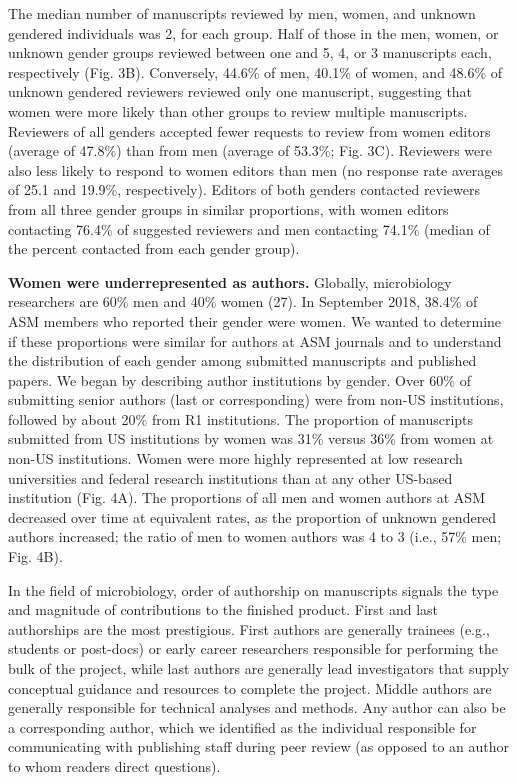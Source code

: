 \documentclass[11pt,]{article}
\begin{document}
The median number of manuscripts reviewed by men, women, and unknown
gendered individuals was 2, for each group. Half of those in the men,
women, or unknown gender groups reviewed between one and 5, 4, or 3
manuscripts each, respectively (Fig. 3B). Conversely, 44.6\% of men,
40.1\% of women, and 48.6\% of unknown gendered reviewers reviewed only
one manuscript, suggesting that women were more likely than other groups
to review multiple manuscripts. Reviewers of all genders accepted fewer
requests to review from women editors (average of 47.8\%) than from men
(average of 53.3\%; Fig. 3C). Reviewers were also less likely to respond
to women editors than men (no response rate averages of 25.1 and 19.9\%,
respectively). Editors of both genders contacted reviewers from all
three gender groups in similar proportions, with women editors
contacting 76.4\% of suggested reviewers and men contacting 74.1\%
(median of the percent contacted from each gender group).

\textbf{Women were underrepresented as authors.} Globally, microbiology
researchers are 60\% men and 40\% women (27). In September 2018, 38.4\%
of ASM members who reported their gender were women. We wanted to
determine if these proportions were similar for authors at ASM journals
and to understand the distribution of each gender among submitted
manuscripts and published papers. We began by describing author
institutions by gender. Over 60\% of submitting senior authors (last or
corresponding) were from non-US institutions, followed by about 20\%
from R1 institutions. The proportion of manuscripts submitted from US
institutions by women was 31\% versus 36\% from women at non-US
institutions. Women were more highly represented at low research
universities and federal research institutions than at any other
US-based institution (Fig. 4A). The proportions of all men and women
authors at ASM decreased over time at equivalent rates, as the
proportion of unknown gendered authors increased; the ratio of men to
women authors was 4 to 3 (i.e., 57\% men; Fig. 4B).

In the field of microbiology, order of authorship on manuscripts signals
the type and magnitude of contributions to the finished product. First
and last authorships are the most prestigious. First authors are
generally trainees (e.g., students or post-docs) or early career
researchers responsible for performing the bulk of the project, while
last authors are generally lead investigators that supply conceptual
guidance and resources to complete the project. Middle authors are
generally responsible for technical analyses and methods. Any author can
also be a corresponding author, which we identified as the individual
responsible for communicating with publishing staff during peer review
(as opposed to an author to whom readers direct questions).
\end{document}
